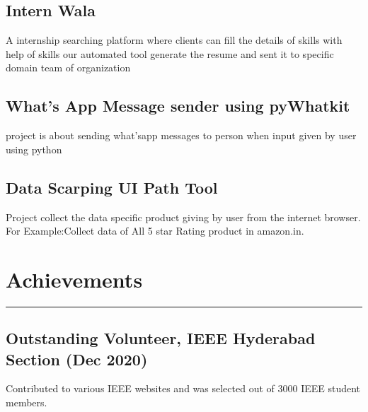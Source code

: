 \documentclass[a4paper]{article}
\begin{document}
\begin{multicols}{2}
\subsection*{Intern Wala}
A internship searching platform where clients can fill the details of skills with help of skills our automated tool generate the resume and sent it to specific domain team of organization 
\vspace{-40pt}
\subsection*{What's App Message sender using pyWhatkit}
project is about sending what'sapp messages to person when input given by user using python
\vspace{-25pt}
\subsection*{Data Scarping UI Path Tool}
Project collect the data specific product giving by user from the internet browser.\\
For Example:Collect data of All 5 star Rating product in amazon.in.
\section*{Achievements}
\vspace{-15pt}
\rule{5cm}{0.4pt}


\subsection*{Outstanding Volunteer, IEEE Hyderabad Section (Dec 2020)}
Contributed to various IEEE websites and was selected out of 3000 IEEE student members.




\end{multicols}
\end{document}
